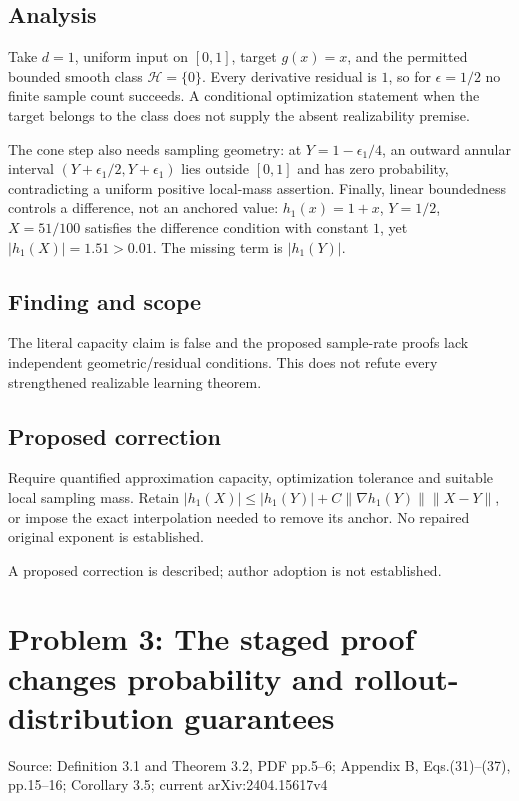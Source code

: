 \documentclass[11pt]{article}
\begin{document}
\subsection*{Analysis}

Take \(d=1\), uniform input on \([0,1]\), target \(g(x)=x\), and the permitted bounded smooth class \(\mathcal H=\{0\}\). Every derivative residual is \(1\), so for \(\epsilon=1/2\) no finite sample count succeeds. A conditional optimization statement when the target belongs to the class does not supply the absent realizability premise.

The cone step also needs sampling geometry: at \(Y=1-\epsilon_1/4\), an outward annular interval \((Y+\epsilon_1/2,Y+\epsilon_1)\) lies outside \([0,1]\) and has zero probability, contradicting a uniform positive local-mass assertion. Finally, linear boundedness controls a difference, not an anchored value: \(h_1(x)=1+x\), \(Y=1/2\), \(X=51/100\) satisfies the difference condition with constant \(1\), yet \(|h_1(X)|=1.51>0.01\). The missing term is \(|h_1(Y)|\).

\subsection*{Finding and scope}

The literal capacity claim is false and the proposed sample-rate proofs lack independent geometric/residual conditions. This does not refute every strengthened realizable learning theorem.

\subsection*{Proposed correction}

Require quantified approximation capacity, optimization tolerance and suitable local sampling mass. Retain \(|h_1(X)|\le|h_1(Y)|+C\|\nabla h_1(Y)\|\|X-Y\|\), or impose the exact interpolation needed to remove its anchor. No repaired original exponent is established.

A proposed correction is described; author adoption is not established.

\section*{Problem 3: The staged proof changes probability and rollout-distribution guarantees}

Source: Definition 3.1 and Theorem 3.2, PDF pp.5–6; Appendix B, Eqs.(31)–(37), pp.15–16; Corollary 3.5; current arXiv:2404.15617v4
\end{document}
